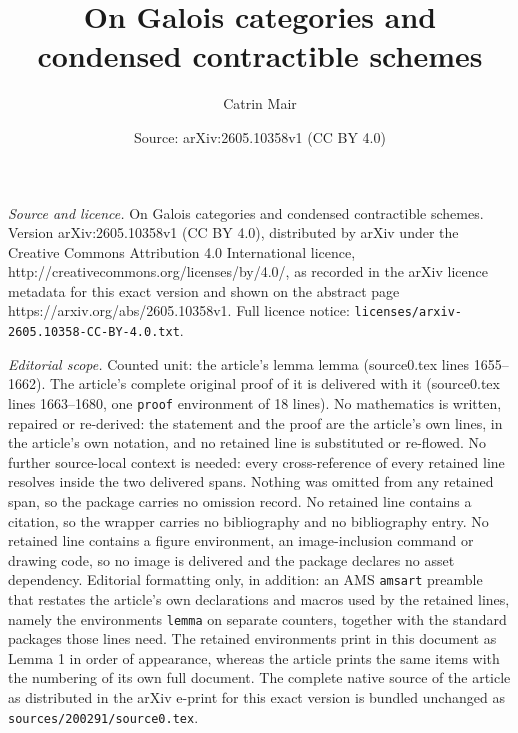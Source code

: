 \documentclass[10pt,a4paper]{amsart}
\title{\Large On Galois categories and condensed contractible schemes}
\author{Catrin Mair}
\date{Source: arXiv:2605.10358v1 (CC BY 4.0)}
\newtheorem{lemma}{Lemma}
\newcommand{\Zpos}[1]{{#1}_{\zar}^{\leq}}
\DeclareMathOperator{\zar}{zar}
\begin{document}
\maketitle

\noindent\emph{Source and licence.} \Large On Galois categories and condensed contractible schemes. Version arXiv:2605.10358v1 (CC BY 4.0), distributed by arXiv under the Creative Commons Attribution 4.0 International licence, http://creativecommons.org/licenses/by/4.0/, as recorded in the arXiv licence metadata for this exact version and shown on the abstract page https://arxiv.org/abs/2605.10358v1. Full licence notice: \texttt{licenses/arxiv-2605.10358-CC-BY-4.0.txt}.\par\smallskip

\noindent\textit{Editorial scope.} Counted unit: the article's lemma lemma (source0.tex lines 1655--1662). The article's complete original proof of it is delivered with it (source0.tex lines 1663--1680, one \texttt{proof} environment of 18 lines). No mathematics is written, repaired or re-derived: the statement and the proof are the article's own lines, in the article's own notation, and no retained line is substituted or re-flowed.  No further source-local context is needed: every cross-reference of every retained line resolves inside the two delivered spans.  Nothing was omitted from any retained span, so the package carries no omission record.  No retained line contains a citation, so the wrapper carries no bibliography and no bibliography entry.  No retained line contains a figure environment, an image-inclusion command or drawing code, so no image is delivered and the package declares no asset dependency.  Editorial formatting only, in addition: an AMS \texttt{amsart} preamble that restates the article's own declarations and macros used by the retained lines, namely the environments \texttt{lemma} on separate counters, together with the standard packages those lines need.  The retained environments print in this document as Lemma 1 in order of appearance, whereas the article prints the same items with the numbering of its own full document.  The complete native source of the article as distributed in the arXiv e-print for this exact version is bundled unchanged as \texttt{sources/200291/source0.tex}.
\end{document}
